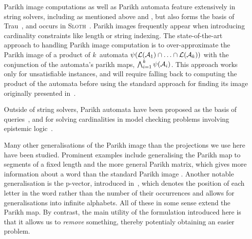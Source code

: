 Parikh image computations as well as Parikh automata feature extensively in
string solvers, including as mentioned above \Ostrich{} and \OstrichPlus{}
\cite{ostrich,ostrich-plus}, but also forms the basis of Trau~\cite{trau-pldi},
and occurs in \textsc{Sloth}~\cite{sloth}. Parikh images frequently appear when
introducing cardinality constraints like length or string indexing. The
state-of-the-art approach to handling Parikh image computation is to
over-approximate the Parikh image of a product of $k$~automata
$\operatorname{\psi}(\operatorname{\mathcal{L}}(\mathcal{A}_1) \cap \ldots \cap \operatorname{\mathcal{L}}(\mathcal{A}_k))$ with the
conjunction of the automata's parikh maps, $\bigwedge_{i=1}^{k}
\operatorname{\psi}(\mathcal{A}_i)$. This approach works only for unsatisfiable instances,
and will require falling back to computing the product of the automata before
using the standard approach for finding its image originally presented
in~\cite{generate-parikh-image}.

Outside of string solvers, Parikh automata have been proposed as the basis of
queries~\cite{graph-queries}, and for solving cardinalities in model checking
problems involving epistemic logic~\cite{epistemic-logic}.

Many other generalisations of the Parikh image than the projections we use here have been
studied. Prominent examples include generalising the Parikh map to segments of a
fixed length \cite{KARHUMAKI1980155} and the more general Parikh matrix, which
gives more information about a word than the standard Parikh image
\cite{parikh-matrix}. Another notable generalisation is the p-vector, introduced
in~\cite{infinite-words}, which denotes the position of each letter in the word
rather than the number of their occurrences and allows for generalisations into
infinite alphabets. All of these in some sense extend the Parikh map. By
contrast, the main utility of the formulation introduced here is that it allows
us to \emph{remove} something, thereby potentialy obtaining an easier problem.
